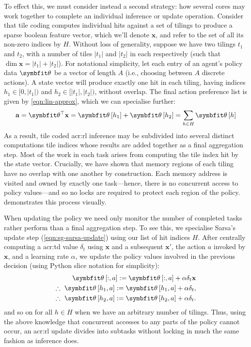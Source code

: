 To effect this, we must consider instead a second strategy: how several cores may work together to complete an individual inference or update operation.
Consider that tile coding computes individual hits against a set of tilings to produce a sparse boolean feature vector, which we'll denote $\mathbf{x}$, and refer to the set of all its non-zero indices by $H$.
Without loss of generality, suppose we have two tilings $t_1$ and $t_2$, with a number of tiles $|t_1|$ and $|t_2|$ in each respectively (such that $\dim{\mathbf{x}}=|t_1|+|t_2|$).
For notational simplicity, let each entry of an agent's policy data $\wvec{}$ be a vector of length $A$ (i.e., choosing between $A$ discrete actions).
A state vector will produce exactly one hit in each tiling, having indices $h_1\in[0,|t_1|)$ and $h_2\in[|t_1|,|t_2|)$, without overlap.
The final action preference list is given by \cref{eqn:lin-approx}, which we can specialise further:
$$
\mathbf{a} = \wvec{}^{\top} \mathbf{x} = \wvec{}\left[h_1\right] + \wvec{}\left[h_2\right] = \sum_{h\in{}H}\wvec{}\left[h\right]
$$
As a result, tile coded \gls{acr:rl} inference may be subdivided into several distinct computations tile indices whose results are added together as a final aggregation step.
Most of the work in each task arises from computing the tile index hit by the state vector.
Crucially, we have shown that memory regions of each tiling have no overlap with one another by construction.
Each memory address is visited and owned by exactly one task---hence, there is no concurrent access to policy values---and so no locks are required to protect each region of the policy.
 demonstrates this process visually.

When updating the policy we need only monitor the number of completed tasks rather perform than a final aggregation step.
To see this, we specialise Sarsa's update step (\cref{eqn:sg-sarsa-update}) using our list of hit indices $H$.
After centrally computing a \gls{acr:td} value $\delta_t$ using $\mathbf{x}$ and a subsequent $\mathbf{x}'$, the action $a$ invoked by $\mathbf{x}$, and a learning rate $\alpha$, we update the policy values involved in the previous decision (using Python slice notation for simplicity):
\begin{align*}
\wvec{}\left[:,a\right] := \wvec{}\left[:,a\right] + \alpha\delta_t \mathbf{x}\\
\therefore~\wvec{}\left[h_1,a\right] := \wvec{}\left[h_1,a\right] + \alpha\delta_t,\\
\therefore~\wvec{}\left[h_2,a\right] := \wvec{}\left[h_2,a\right] + \alpha\delta_t.
\end{align*}
and so on for all $h \in H$ when we have an arbitrary number of tilings.
Thus, using the above knowledge that concurrent accesses to any parts of the policy cannot occur, an \gls{acr:rl} update divides into subtasks without locking in much the same fashion as inference does.

